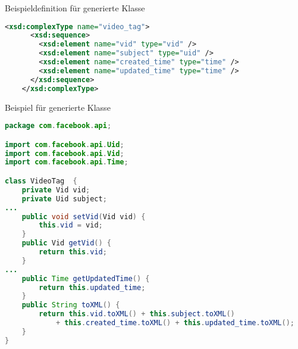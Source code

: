 \begin{frame}[fragile]{Beispieldefinition für generierte Klasse}
    \begin{lstlisting}[language=XML, label=lst:xsdVideoTag, caption=Beispieldefinition für generierte Klasse von \Cref{lst:javaExample} (aus \cite{facebookXSD})]
    <xsd:complexType name="video_tag">
      <xsd:sequence>
        <xsd:element name="vid" type="vid" />
        <xsd:element name="subject" type="uid" />
        <xsd:element name="created_time" type="time" />
        <xsd:element name="updated_time" type="time" />
      </xsd:sequence>
    </xsd:complexType>
    \end{lstlisting}
\end{frame}

\begin{frame}[fragile]{Beispiel für generierte Klasse}
    \begin{adjustbox}{height=0.4\textheight,keepaspectratio}
        \begin{lstlisting}[language=Java, label=lst:javaExample, caption=Beispiel für eine generierte Java-Datei (gekürzt)]
package com.facebook.api;

import com.facebook.api.Uid;
import com.facebook.api.Vid;
import com.facebook.api.Time;

class VideoTag  {
    private Vid vid;
    private Uid subject;
...
    public void setVid(Vid vid) {
        this.vid = vid;
    }
    public Vid getVid() {
        return this.vid;
    }
...
    public Time getUpdatedTime() {
        return this.updated_time;
    }
    public String toXML() {
        return this.vid.toXML() + this.subject.toXML()
            + this.created_time.toXML() + this.updated_time.toXML();
    }
}
        \end{lstlisting}
    \end{adjustbox}
\end{frame}